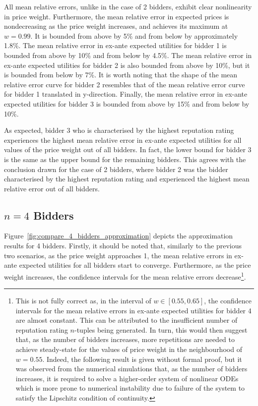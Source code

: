 All mean relative errors, unlike in the case of 2 bidders, exhibit clear nonlinearity in price weight. Furthermore, the mean relative error in expected prices is nondecreasing as the price weight increases, and achieves its maximum at $w = 0.99$. It is bounded from above by 5\% and from below by approximately 1.8\%. The mean relative error in ex-ante expected utilities for bidder 1 is bounded from above by 10\% and from below by 4.5\%. The mean relative error in ex-ante expected utilities for bidder 2 is also bounded from above by 10\%, but it is bounded from below by 7\%. It is worth noting that the shape of the mean relative error curve for bidder 2 resembles that of the mean relative error curve for bidder 1 translated in y-direction. Finally, the mean relative error in ex-ante expected utilities for bidder 3 is bounded from above by 15\% and from below by 10\%.

As expected, bidder 3 who is characterised by the highest reputation rating experiences the highest mean relative error in ex-ante expected utilities for all values of the price weight out of all bidders. In fact, the lower bound for bidder 3 is the same as the upper bound for the remaining bidders. This agrees with the conclusion drawn for the case of 2 bidders, where bidder 2 was the bidder characterised by the highest reputation rating and experienced the highest mean relative error out of all bidders.

\subsection{$n=4$ Bidders} %
\label{sub:n_4_bidders_approximation}
Figure~\ref{fig:compare_4_bidders_approximation} depicts the approximation results for 4 bidders. Firstly, it should be noted that, similarly to the previous two scenarios, as the price weight approaches 1, the mean relative errors in ex-ante expected utilities for all bidders start to converge. Furthermore, as the price weight increases, the confidence intervals for the mean relative errors decrease\footnote{This is not fully correct as, in the interval of $w\in [0.55, 0.65]$, the confidence intervals for the mean relative errors in ex-ante expected utilities for bidder 4 are almost constant. This can be attributed to the insufficient number of reputation rating $n$-tuples being generated. In turn, this would then suggest that, as the number of bidders increases, more repetitions are needed to achieve steady-state for the values of price weight in the neighbourhood of $w=0.55$. Indeed, the following result is given without formal proof, but it was observed from the numerical simulations that, as the number of bidders increases, it is required to solve a higher-order system of nonlinear ODEs which is more prone to numerical instability due to failure of the system to satisfy the Lipschitz condition of continuity.}.

